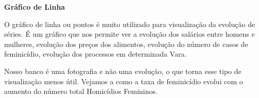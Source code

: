 \documentclass[
  letterpaper,
  DIV=11,
  numbers=noendperiod]{scrreprt}
\newenvironment{Shaded}{\begin{snugshade}}{\end{snugshade}}
\newcommand{\CommentTok}[1]{\textcolor[rgb]{0.37,0.37,0.37}{#1}}
\newcommand{\FunctionTok}[1]{\textcolor[rgb]{0.28,0.35,0.67}{#1}}
\newcommand{\NormalTok}[1]{\textcolor[rgb]{0.00,0.23,0.31}{#1}}
\newcommand{\OtherTok}[1]{\textcolor[rgb]{0.00,0.23,0.31}{#1}}
\newcommand{\SpecialCharTok}[1]{\textcolor[rgb]{0.37,0.37,0.37}{#1}}
\begin{document}
\textbf{Gráfico de Linha}

O gráfico de linha ou pontos é muito utilizado para visualização da
evolução de séries. É um gráfico que nos permite ver a evolução dos
salários entre homens e mulheres, evolução dos preços dos alimentos,
evolução do número de casos de feminicídio, evolução dos processos em
determinada Vara.

Nosso banco é uma fotografia e não uma evolução, o que torna esse tipo
de visualização menos útil. Vejamos a como a taxa de feminicídio evolui
com o aumento do número total Homicídios Femininos.

\begin{Shaded}
\end{Shaded}
\end{document}
